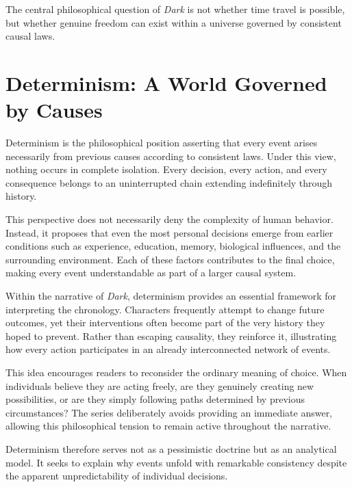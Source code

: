 \documentclass[12pt,oneside,openany]{book}
\begin{document}
\begin{tcolorbox}[colback=gray!8,colframe=black,title=Key Observation]
The central philosophical question of \textit{Dark} is not whether time travel
is possible, but whether genuine freedom can exist within a universe governed
by consistent causal laws.
\end{tcolorbox}
\section{Determinism: A World Governed by Causes}

Determinism is the philosophical position asserting that every event arises
necessarily from previous causes according to consistent laws. Under this
view, nothing occurs in complete isolation. Every decision, every action, and
every consequence belongs to an uninterrupted chain extending indefinitely
through history.

This perspective does not necessarily deny the complexity of human behavior.
Instead, it proposes that even the most personal decisions emerge from earlier
conditions such as experience, education, memory, biological influences, and
the surrounding environment. Each of these factors contributes to the final
choice, making every event understandable as part of a larger causal system.

Within the narrative of \textit{Dark}, determinism provides an essential
framework for interpreting the chronology. Characters frequently attempt to
change future outcomes, yet their interventions often become part of the very
history they hoped to prevent. Rather than escaping causality, they reinforce
it, illustrating how every action participates in an already interconnected
network of events.

This idea encourages readers to reconsider the ordinary meaning of choice.
When individuals believe they are acting freely, are they genuinely creating
new possibilities, or are they simply following paths determined by previous
circumstances? The series deliberately avoids providing an immediate answer,
allowing this philosophical tension to remain active throughout the narrative.

Determinism therefore serves not as a pessimistic doctrine but as an
analytical model. It seeks to explain why events unfold with remarkable
consistency despite the apparent unpredictability of individual decisions.
\end{document}
